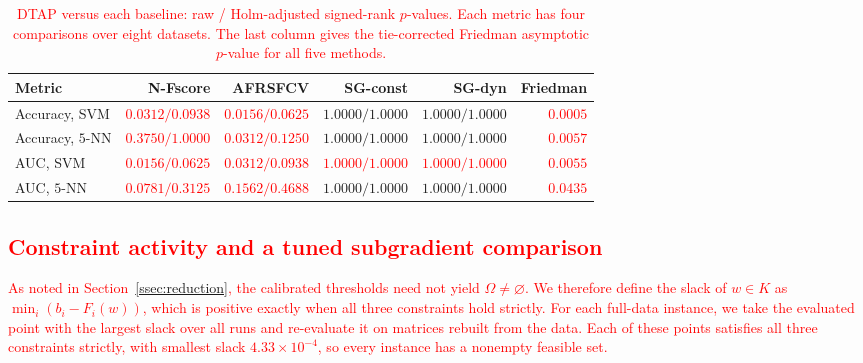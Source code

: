 \documentclass[]{interact}
\theoremstyle{plain}
\theoremstyle{definition}
\theoremstyle{remark}
\begin{document}
\begin{table}[htbp]
\centering\footnotesize\setlength{\tabcolsep}{4pt}
\caption{\textcolor{red}{DTAP versus each baseline: raw / Holm-adjusted signed-rank $p$-values. Each metric has four comparisons over eight datasets. The last column gives the tie-corrected Friedman asymptotic $p$-value for all five methods.}}\label{tab:wilcoxon}
\begin{tabular}{lrrrrr}
\toprule
Metric & N-Fscore & AFRSFCV & SG-const & SG-dyn & Friedman \\
\midrule
Accuracy, SVM & \leavevmode\textcolor{red}{$0.0312/0.0938$} & \leavevmode\textcolor{red}{$0.0156/0.0625$} & $1.0000/1.0000$ & $1.0000/1.0000$ & \leavevmode\textcolor{red}{$0.0005$} \\
Accuracy, $5$-NN & \leavevmode\textcolor{red}{$0.3750/1.0000$} & \leavevmode\textcolor{red}{$0.0312/0.1250$} & $1.0000/1.0000$ & $1.0000/1.0000$ & \leavevmode\textcolor{red}{$0.0057$} \\
AUC, SVM & \leavevmode\textcolor{red}{$0.0156/0.0625$} & \leavevmode\textcolor{red}{$0.0312/0.0938$} & \leavevmode\textcolor{red}{$1.0000/1.0000$} & \leavevmode\textcolor{red}{$1.0000/1.0000$} & \leavevmode\textcolor{red}{$0.0055$} \\
AUC, $5$-NN & \leavevmode\textcolor{red}{$0.0781/0.3125$} & \leavevmode\textcolor{red}{$0.1562/0.4688$} & $1.0000/1.0000$ & $1.0000/1.0000$ & \leavevmode\textcolor{red}{$0.0435$} \\
\bottomrule
\end{tabular}

\end{table}

\subsection{\textcolor{red}{Constraint activity and a tuned subgradient comparison}}
\label{ssec:feasibility-audit}

\leavevmode\textcolor{red}{As noted in Section~\ref{ssec:reduction}, the calibrated thresholds need not yield $\Omega\ne\varnothing$. We therefore define the slack of $w\in K$ as $\min_i(b_i-F_i(w))$, which is positive exactly when all three constraints hold strictly. For each full-data instance, we take the evaluated point with the largest slack over all runs and re-evaluate it on matrices rebuilt from the data. Each of these points satisfies all three constraints strictly, with smallest slack $4.33\times10^{-4}$, so every instance has a nonempty feasible set.}
\end{document}
